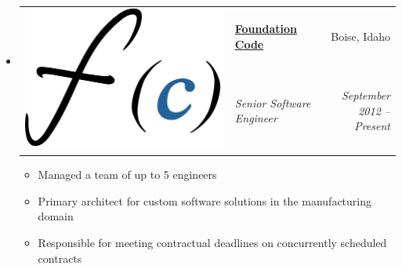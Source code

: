 \documentclass[letterpaper,11pt]{article}
\makeatletter
\newcommand{\resitem}[1]{\item #1 \vspace{-2pt}}
\newcommand{\ressubheadingG}[5]{
\item[]
	\begin{tabular*}{6.5in}{l@{\hspace{.1in}} l@{\extracolsep{\fill}}r}
		\multirow{2}{1in}{#1} & \textbf{#2} & #3 \\
		& \textit{#4} & \textit{#5} \\
         \end{tabular*}
	 \vspace{-6pt}}
\makeatother
\begin{document}
\begin{itemize}
  \ressubheadingG
    {\includegraphics[scale=.15]{fc.png}}
    {{\href{https://foundationcode.com}{Foundation Code}}}
    {Boise, Idaho}
    {Senior Software Engineer}
    {September 2012 -- Present}
    { \footnotesize
    \begin{itemize}
      \resitem{Managed a team of up to 5 engineers}
      \resitem{Primary architect for custom software solutions in the
	       manufacturing domain}
      \resitem{Responsible for meeting contractual deadlines on
		    concurrently scheduled contracts}
    \end{itemize}
  }


\end{itemize}
\end{document}
